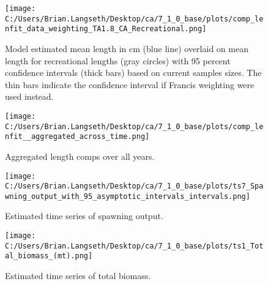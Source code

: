\documentclass[11pt,
  english,
  a4paper,
]{article}
\begin{document}
\begin{figure}
\centering
\texttt{[image: C:/Users/Brian.Langseth/Desktop/ca/7\_1\_0\_base/plots/comp\_lenfit\_data\_weighting\_TA1.8\_CA\_Recreational.png]}
\caption{Model estimated mean length in cm (blue line) overlaid on mean length for recreational lengths (gray circles) with 95 percent confidence intervals (thick bars) based on current samples sizes. The thin bars indicate the confidence interval if Francis weighting were used instead.\label{fig:rec-mean-len-fit}}
\end{figure}

\tagmcend\tagstructend


\begin{figure}
\centering
\texttt{[image: C:/Users/Brian.Langseth/Desktop/ca/7\_1\_0\_base/plots/comp\_lenfit\_\_aggregated\_across\_time.png]}
\caption{Aggregated length comps over all years.\label{fig:agg-len-fit}}
\end{figure}

\tagmcend\tagstructend


\begin{figure}
\centering
\texttt{[image: C:/Users/Brian.Langseth/Desktop/ca/7\_1\_0\_base/plots/ts7\_Spawning\_output\_with\_95\_asymptotic\_intervals\_intervals.png]}
\caption{Estimated time series of spawning output.\label{fig:ssb}}
\end{figure}

\tagmcend\tagstructend


\begin{figure}
\centering
\texttt{[image: C:/Users/Brian.Langseth/Desktop/ca/7\_1\_0\_base/plots/ts1\_Total\_biomass\_(mt).png]}
\caption{Estimated time series of total biomass.\label{fig:tot-bio}}
\end{figure}

\tagmcend\tagstructend

\end{document}

